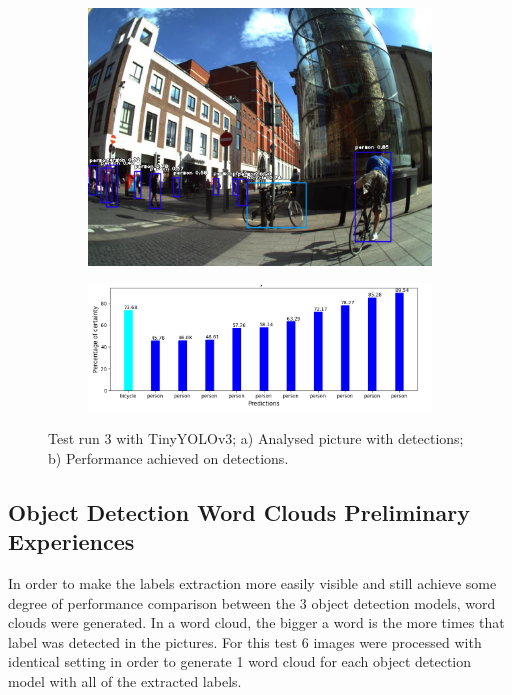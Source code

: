           \begin{figure}[H]
            \centering
            \captionsetup{justification=centering}
    
            \begin{subfigure}{0.29\textwidth}
            \includegraphics[width=\textwidth]{Sections/4InitialWork/4_images_obj_run4/yolo_tiny.jpg} 
            \caption{}
            \end{subfigure}
            \begin{subfigure}{0.65\textwidth}
            \includegraphics[width=\textwidth]{Sections/4InitialWork/4_images_obj_run4/tiny_yolo_graph.png}
            \caption{}
            \end{subfigure}
            
            \caption[Test run 3 with TinyYOLOv3]{ 
            Test run 3 with TinyYOLOv3; a) Analysed picture with detections; b) Performance achieved on detections. }
            \label{fig:tiny_3}
            \end{figure}


    \newpage

    \subsection{Object Detection Word Clouds Preliminary Experiences}
    \label{ch:wordclouds}
    In order to make the labels extraction more easily visible and still achieve some degree of performance comparison between the 3 object detection models, word clouds were generated. In a word cloud, the bigger a word is the more times that label was detected in the pictures. For this test 6 images were processed with identical setting in order to generate 1 word cloud for each object detection model with all of the extracted labels.

